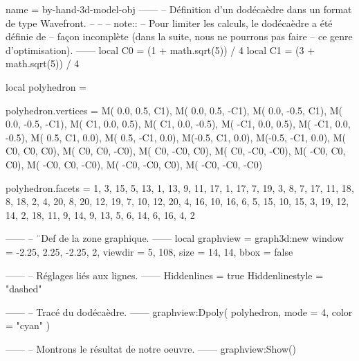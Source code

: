 \documentclass[border = 3pt]{standalone}
\begin{document}
\begin{luadraw*}{name = by-hand-3d-model-obj}
------
-- Définition d'un dodécaèdre dans un format de type Wavefront.
--
--
-- note::
--     Pour limiter les calculs, le dodécaèdre a été définie de
--     façon incomplète (dans la suite, nous ne pourrons pas faire
--     ce genre d'optimisation).
------
local C0 = (1 + math.sqrt(5)) / 4
local C1 = (3 + math.sqrt(5)) / 4

local polyhedron = {}

polyhedron.vertices = {
  M( 0.0,  0.5,   C1),
  M( 0.0,  0.5,  -C1),
  M( 0.0, -0.5,   C1),
  M( 0.0, -0.5,  -C1),
  M(  C1,  0.0,  0.5),
  M(  C1,  0.0, -0.5),
  M( -C1,  0.0,  0.5),
  M( -C1,  0.0, -0.5),
  M( 0.5,   C1,  0.0),
  M( 0.5,  -C1,  0.0),
  M(-0.5,   C1,  0.0),
  M(-0.5,  -C1,  0.0),
  M(  C0,   C0,   C0),
  M(  C0,   C0,  -C0),
  M(  C0,  -C0,   C0),
  M(  C0,  -C0,  -C0),
  M( -C0,   C0,   C0),
  M( -C0,   C0,  -C0),
  M( -C0,  -C0,   C0),
  M( -C0,  -C0,  -C0)
}

polyhedron.facets = {
  {  1,  3, 15,  5, 13},
  {  1, 13,  9, 11, 17},
  {  1, 17,  7, 19,  3},
  {  8,  7, 17, 11, 18},
  {  8, 18,  2,  4, 20},
  {  8, 20, 12, 19,  7},
  { 10, 12, 20,  4, 16},
  { 10, 16,  6,  5, 15},
  { 10, 15,  3, 19, 12},
  { 14,  2, 18, 11,  9},
  { 14,  9, 13,  5,  6},
  { 14,  6, 16,  4,  2}
}

------
-- ¨Def de la zone graphique.
------
local graphview = graph3d:new{
  window  = {-2.25, 2.25, -2.25, 2},
  viewdir = {5, 108},
  size    = {14, 14},
  bbox    = false
}

------
-- Réglages liés aux lignes.
------
Hiddenlines     = true
Hiddenlinestyle = "dashed"

------
-- Tracé du dodécaèdre.
------
graphview:Dpoly(
  polyhedron,
  {
    mode  = 4,
    color = "cyan"
  }
)

------
-- Montrons le résultat de notre oeuvre.
------
graphview:Show()
\end{luadraw*}
\end{document}
